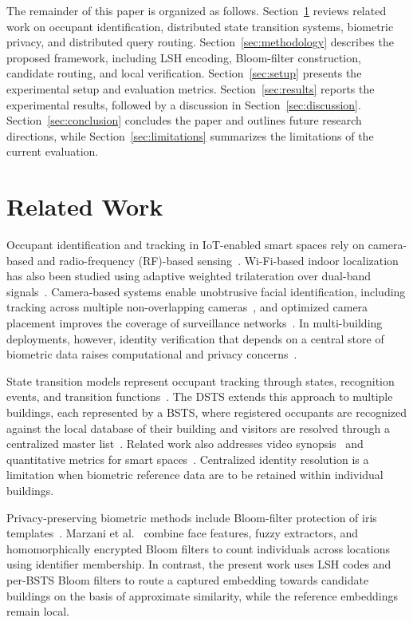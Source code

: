 \documentclass[pdflatex,sn-mathphys-num]{sn-jnl}%
\theoremstyle{thmstyleone}%
\theoremstyle{thmstyletwo}%
\theoremstyle{thmstylethree}%
\begin{document}
The remainder of this paper is organized as follows. Section~\ref{sec:related} reviews related work on occupant identification, distributed state transition systems, biometric privacy, and distributed query routing. Section~\ref{sec:methodology} describes the proposed framework, including LSH encoding, Bloom-filter construction, candidate routing, and local verification. Section~\ref{sec:setup} presents the experimental setup and evaluation metrics. Section~\ref{sec:results} reports the experimental results, followed by a discussion in Section~\ref{sec:discussion}. Section~\ref{sec:conclusion} concludes the paper and outlines future research directions, while Section~\ref{sec:limitations} summarizes the limitations of the current evaluation.



\section{Related Work}
\label{sec:related}

Occupant identification and tracking in IoT-enabled smart spaces rely on camera-based and radio-frequency (RF)-based sensing~\cite{mohan2020,WZSYGWLLHSC2025}. Wi-Fi-based indoor localization has also been studied using adaptive weighted trilateration over dual-band signals~\cite{MSSAB2019}. Camera-based systems enable unobtrusive facial identification, including tracking across multiple non-overlapping cameras~\cite{nair2021}, and optimized camera placement improves the coverage of surveillance networks~\cite{SM2022}. In multi-building deployments, however, identity verification that depends on a central store of biometric data raises computational and privacy concerns~\cite{mohan2020}.

State transition models represent occupant tracking through states, recognition events, and transition functions~\cite{MJG2011}. The DSTS extends this approach to multiple buildings, each represented by a BSTS, where registered occupants are recognized against the local database of their building and visitors are resolved through a centralized master list~\cite{mohan2020}. Related work also addresses video synopsis~\cite{NGA2022} and quantitative metrics for smart spaces~\cite{MMJ2025}. Centralized identity resolution is a limitation when biometric reference data are to be retained within individual buildings.

Privacy-preserving biometric methods include Bloom-filter protection of iris templates~\cite{rathgeb2014}. Marzani et al.~\cite{marzani2026} combine face features, fuzzy extractors, and homomorphically encrypted Bloom filters to count individuals across locations using identifier membership. In contrast, the present work uses LSH codes and per-BSTS Bloom filters to route a captured embedding towards candidate buildings on the basis of approximate similarity, while the reference embeddings remain local.
\end{document}
